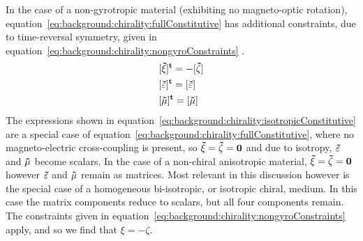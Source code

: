 In the case of a non-gyrotropic material (exhibiting no magneto-optic rotation), equation~\ref{eq:background:chirality:fullConstitutive} has additional constraints, due to time-reversal symmetry, given in equation~\ref{eq:background:chirality:nongyroConstraints} \cite{Ishimaru2003}.
\begin{equation}\label{eq:background:chirality:nongyroConstraints}
    \begin{split}
        &[\bf{\tilde \xi}]^t = -[\bf{\tilde \zeta}] \\
        &[\bf{\tilde \varepsilon}]^t = [\bf{\tilde \varepsilon}] \\
        &[\bf{\tilde \mu}]^t = [\bf{\tilde \mu}]
    \end{split}
\end{equation}
The expressions shown in equation~\ref{eq:background:chirality:isotropicConstitutive} are a special case of equation~\ref{eq:background:chirality:fullConstitutive}, where no magneto-electric cross-coupling is present, so $\bf{\tilde \xi}=\bf{\tilde \zeta}=0$ and due to isotropy, $\bf{\tilde \varepsilon}$ and $\bf{\tilde \mu}$ become scalars. 
In the case of a non-chiral anisotropic material, $\bf{\tilde \xi}=\bf{\tilde \zeta}=0$ however $\bf{\tilde \varepsilon}$ and $\bf{\tilde \mu}$ remain as matrices. Most relevant in this discussion however is the special case of a homogeneous bi-isotropic, or isotropic chiral, medium. 
In this case the matrix components reduce to scalars, but all four components remain. The constraints given in equation~\ref{eq:background:chirality:nongyroConstraints} apply, and so we find that $\xi =-\zeta $.

